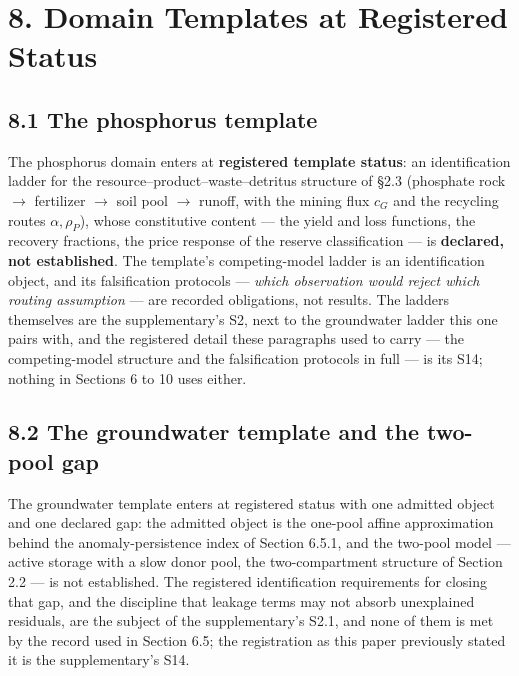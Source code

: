 \documentclass[11pt]{article}
\begin{document}
\vspace{0.8em}

\section*{8. Domain Templates at Registered Status}\label{8-domain-templates-at-registered-status}

\subsection*{8.1 The phosphorus template}\label{81-the-phosphorus-template}

The phosphorus domain enters at \textbf{registered template status}: an identification ladder for the resource--product--waste--detritus structure of \S2.3 (phosphate rock \(\to\) fertilizer \(\to\) soil pool \(\to\) runoff, with the mining flux \(c_G\) and the recycling routes \(\alpha,\rho_P\)), whose constitutive content --- the yield and loss functions, the recovery fractions, the price response of the reserve classification --- is \textbf{declared, not established}. The template's competing-model ladder is an identification object, and its falsification protocols --- \emph{which observation would reject which routing assumption} --- are recorded obligations, not results. The ladders themselves are the supplementary's S2, next to the groundwater ladder this one pairs with, and the registered detail these paragraphs used to carry --- the competing-model structure and the falsification protocols in full --- is its S14; nothing in Sections 6 to 10 uses either.

\subsection*{8.2 The groundwater template and the two-pool gap}\label{82-the-groundwater-template-and-the-two-pool-gap}

The groundwater template enters at registered status with one admitted object and one declared gap: the admitted object is the one-pool affine approximation behind the anomaly-persistence index of Section 6.5.1, and the two-pool model --- active storage with a slow donor pool, the two-compartment structure of Section 2.2 --- is not established. The registered identification requirements for closing that gap, and the discipline that leakage terms may not absorb unexplained residuals, are the subject of the supplementary's S2.1, and none of them is met by the record used in Section 6.5; the registration as this paper previously stated it is the supplementary's S14.
\end{document}
